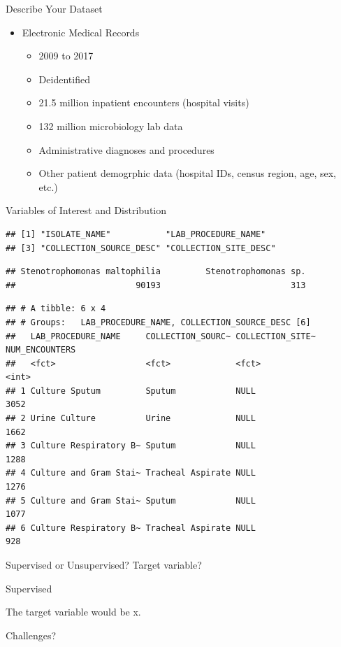 \documentclass[ignorenonframetext,]{beamer}
\providecommand{\tightlist}{%
  \setlength{\itemsep}{0pt}\setlength{\parskip}{0pt}}
\begin{document}
\begin{frame}{Describe Your Dataset}

\begin{itemize}
\tightlist
\item
  Electronic Medical Records

  \begin{itemize}
  \tightlist
  \item
    2009 to 2017
  \item
    Deidentified
  \item
    21.5 million inpatient encounters (hospital visits)
  \item
    132 million microbiology lab data
  \item
    Administrative diagnoses and procedures
  \item
    Other patient demogrphic data (hospital IDs, census region, age,
    sex, etc.)
  \end{itemize}
\end{itemize}

\end{frame}

\begin{frame}[fragile]{Variables of Interest and Distribution}

\begin{verbatim}
## [1] "ISOLATE_NAME"           "LAB_PROCEDURE_NAME"    
## [3] "COLLECTION_SOURCE_DESC" "COLLECTION_SITE_DESC"
\end{verbatim}

\begin{verbatim}
## Stenotrophomonas maltophilia         Stenotrophomonas sp. 
##                        90193                          313
\end{verbatim}

\begin{verbatim}
## # A tibble: 6 x 4
## # Groups:   LAB_PROCEDURE_NAME, COLLECTION_SOURCE_DESC [6]
##   LAB_PROCEDURE_NAME     COLLECTION_SOURC~ COLLECTION_SITE~ NUM_ENCOUNTERS
##   <fct>                  <fct>             <fct>                     <int>
## 1 Culture Sputum         Sputum            NULL                       3052
## 2 Urine Culture          Urine             NULL                       1662
## 3 Culture Respiratory B~ Sputum            NULL                       1288
## 4 Culture and Gram Stai~ Tracheal Aspirate NULL                       1276
## 5 Culture and Gram Stai~ Sputum            NULL                       1077
## 6 Culture Respiratory B~ Tracheal Aspirate NULL                        928
\end{verbatim}

\end{frame}

\begin{frame}{Supervised or Unsupervised? Target variable?}

Supervised

The target variable would be x.

\end{frame}

\begin{frame}{Challenges?}

\end{frame}
\end{document}
